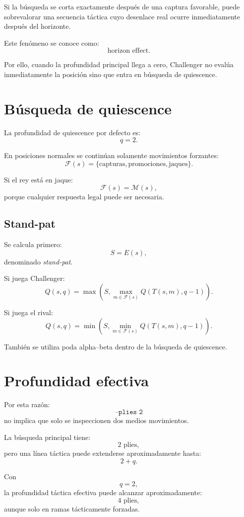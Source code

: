 \documentclass[11pt,a4paper]{article}
\begin{document}
Si la búsqueda se corta exactamente después de una captura favorable, puede
sobrevalorar una secuencia táctica cuyo desenlace real ocurre inmediatamente
después del horizonte.

Este fenómeno se conoce como:
\[
\boxed{\text{horizon effect}}.
\]

Por ello, cuando la profundidad principal llega a cero, Challenger no evalúa
inmediatamente la posición sino que entra en búsqueda de quiescence.

\section{Búsqueda de quiescence}

La profundidad de quiescence por defecto es:
\[
q=2.
\]

En posiciones normales se continúan solamente movimientos forzantes:
\[
\mathcal F(s)=
\{
\text{capturas},
\text{promociones},
\text{jaques}
\}.
\]

Si el rey está en jaque:
\[
\mathcal F(s)=\mathcal M(s),
\]
porque cualquier respuesta legal puede ser necesaria.

\subsection{Stand-pat}

Se calcula primero:
\[
S=E(s),
\]
denominado \emph{stand-pat}.

Si juega Challenger:
\[
Q(s,q)=
\max
\left(
S,
\max_{m\in\mathcal F(s)}
Q(T(s,m),q-1)
\right).
\]

Si juega el rival:
\[
Q(s,q)=
\min
\left(
S,
\min_{m\in\mathcal F(s)}
Q(T(s,m),q-1)
\right).
\]

También se utiliza poda alpha--beta dentro de la búsqueda de quiescence.

\section{Profundidad efectiva}

Por esta razón:
\[
\texttt{--plies 2}
\]
no implica que solo se inspeccionen dos medios movimientos.

La búsqueda principal tiene:
\[
2\text{ plies},
\]
pero una línea táctica puede extenderse aproximadamente hasta:
\[
2+q.
\]

Con
\[
q=2,
\]
la profundidad táctica efectiva puede alcanzar aproximadamente:
\[
4\text{ plies},
\]
aunque solo en ramas tácticamente forzadas.
\end{document}
